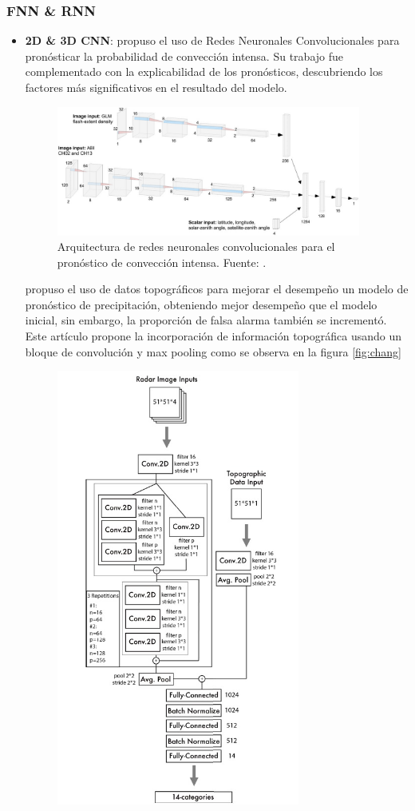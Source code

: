 \subsubsection{FNN \& RNN}
\begin{itemize}
  \item \textbf{2D \& 3D CNN}: \cite{Cintineo2020} propuso el uso de Redes 
  Neuronales Convolucionales para pronósticar la probabilidad de convección 
  intensa. Su trabajo fue complementado con la explicabilidad de los 
  pronósticos, descubriendo los factores más significativos en el resultado del 
  modelo.
  \begin{figure}[H]
    \centering
    \includegraphics[width=10cm]{E_IMAGENES/3_EstadoArte/cintineo_1}
    \caption{
      Arquitectura de redes neuronales convolucionales para el pronóstico de 
      convección intensa. Fuente: \cite{Cintineo2020}.
    }
    \label{fig:cintineo}
  \end{figure}
  \cite{Chang2018} propuso el uso de datos topográficos para mejorar el 
  desempeño un modelo de pronóstico de precipitación, obteniendo mejor 
  desempeño que el modelo inicial, sin embargo, la proporción de falsa alarma 
  también se incrementó. Este artículo propone la incorporación de información 
  topográfica usando un bloque de convolución y max pooling como se observa en 
  la figura \ref{fig:chang}
  \begin{figure}[H]
    \centering
    \includegraphics[width=8cm]{E_IMAGENES/3_EstadoArte/chang_1}

\end{figure}
\end{itemize}
